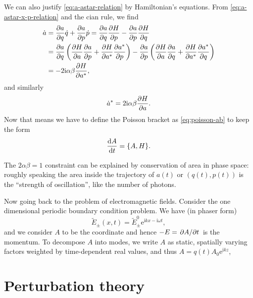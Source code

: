 \documentclass[hyperref, a4paper]{article}
\newcommand*{\ii}{\mathrm{i}}
\newcommand*{\ee}{\mathrm{e}}
\begin{document}
We can also justify \eqref{eq:a-astar-relation} by Hamiltonian's equations.
From \eqref{eq:a-astar-x-p-relation} and the cian rule, we find 
\begin{equation}
    \begin{aligned}
    \dot{a} &= \pdv{a}{q} \dot{q} + \pdv{a}{p} \dot{p}
    = \pdv{a}{q} \pdv{H}{p} - \pdv{a}{p} \pdv{H}{q} \\
    &= \pdv{a}{q} \left(\pdv{H}{a} \pdv{a}{p} + \pdv{H}{a^*} \pdv{a^*}{p}\right)
    - \pdv{a}{p}  \left(\pdv{H}{a} \pdv{a}{q} + \pdv{H}{a^*} \pdv{a^*}{q}\right) \\
    &= - 2 \ii \alpha \beta \pdv{H}{a^*},
    \end{aligned}
\end{equation}
and similarly 
\begin{equation}
    \dot{a}^* = 2 \ii \alpha \beta \pdv{H}{a}.
\end{equation}
Now that means we have to define the Poisson bracket as  \eqref{eq:poisson-ab}
to keep the form 
\begin{equation}
    \dv{A}{t} = \poissonbracket{A}{H}.
\end{equation}

The $2 \alpha \beta = 1$ constraint can be explained by conservation of area in phase space: 
roughly speaking the area inside the trajectory of $a(t)$ or $(q(t), p(t))$ 
is the ``strength of oscillation'', like the number of photons.

Now going back to the problem of electromagnetic fields.
Consider the one dimensional periodic boundary condition problem.
We have (in phaser form)
\begin{equation}
    \tilde{E}_\pm(x, t) = \tilde{E}_\pm^0 \ee^{\ii k x - \ii \omega t}, 
\end{equation}
and we consider $A$ to be the coordinate and hence $-E = \pdv*{A}{t}$ is the momentum.
To decompose $A$ into modes, we write $A$ as static, spatially varying factors weighted by time-dependent real values,
and thus $A = q(t) A_0 \ee^{\ii k z}$, 

\section{Perturbation theory}
\end{document}
